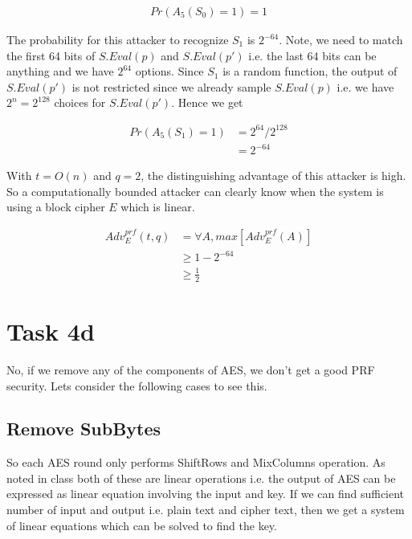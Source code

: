 \documentclass{article}
\begin{document}
    \begin{align*}
        Pr(A_5(S_0) = 1) = 1
    \end{align*}

    The probability for this attacker to recognize $S_1$ is $2^{-64}$. Note, we need to match the first 64 bits of $S.Eval(p)$ and $S.Eval(p')$ i.e. the last 64 bits can be anything and we have $2^{64}$ options. Since $S_1$ is a random function, the output of $S.Eval(p')$ is not restricted since we already sample $S.Eval(p)$ i.e. we have $2^n = 2^{128}$ choices for $S.Eval(p')$. Hence we get

    \begin{align*}
        Pr(A_5(S_1) = 1)    & = 2^{64} / 2^{128} \\
                            & = 2^{-64}
    \end{align*}

    With $t = O(n)$ and $q = 2$, the distinguishing advantage of this attacker is high. So a computationally bounded attacker can clearly know when the system is using a block cipher $E$ which is linear.

    \begin{align*}
        Adv_E^{prf} (t, q)  & = \forall A, max[ Adv_E^{prf}(A) ] \\
                            & \ge 1 - 2^{-64} \\
                            & \ge \frac{1}{2}
    \end{align*}

    \section*{Task 4d}
    No, if we remove any of the components of AES, we don't get a good PRF security. Lets consider the following cases to see this.

    \subsection*{Remove SubBytes}
    So each AES round only performs ShiftRows and MixColumns operation. As noted in class both of these are linear operations i.e. the output of AES can be expressed as linear equation involving the input and key. If we can find sufficient number of input and output i.e. plain text and cipher text, then we get a system of linear equations which can be solved to find the key.
\end{document}
